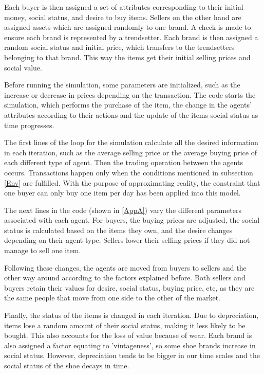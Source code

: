 \documentclass[12pt]{article}
\begin{document}
Each buyer is then assigned a set of attributes corresponding to their initial money, social status, and desire to buy items. Sellers on the other hand are assigned assets which are assigned randomly to one brand. A check is made to ensure each brand is represented by a trendsetter. Each brand is then assigned a random social status and initial price, which transfers to the trendsetters belonging to that brand. This way the items get their initial selling prices and social value.

Before running the simulation, some parameters are initialized, such as the increase or decrease in prices depending on the transaction. The code starts the simulation, which performs the purchase of the item, the change in the agents' attributes according to their actions and the update of the items social status as time progresses.

The first lines of the loop for the simulation calculate all the desired information in each iteration, such as the average selling price or the average buying price of each different type of agent. Then the trading operation between the agents occurs. Transactions happen only when the conditions mentioned in subsection \ref{Env} are fulfilled. With the purpose of approximating reality, the constraint that one buyer can only buy one item per day has been applied into this model. 

The next lines in the code (shown in \ref{AppA}) vary the different parameters associated with each agent. For buyers, the buying prices are adjusted, the social status is calculated based on the items they own, and the desire changes depending on their agent type. Sellers lower their selling prices if they did not manage to sell one item. 

Following these changes, the agents are moved from buyers to sellers and the other way around according to the factors explained before. Both sellers and buyers retain their values for desire, social status, buying price, etc, as they are the same people that move from one side to the other of the market.

Finally, the status of the items is changed in each iteration. Due to depreciation, items lose a random amount of their social status, making it less likely to be bought. This also accounts for the loss of value because of wear. Each brand is also assigned a factor equating to 'vintageness', so some shoe brands increase in social status. However, depreciation tends to be bigger in our time scales and the social status of the shoe decays in time.
\end{document}
